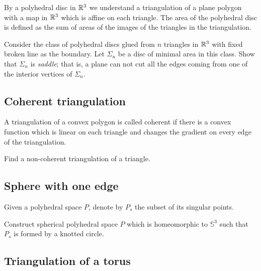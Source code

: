 By a polyhedral disc in $\mathbb{R}^3$
we understand a triangulation of a plane polygon with a map in $\mathbb{R}^3$ which is affine on each triangle.
The area of the polyhedral disc is defined as the sum of areas of the images of the triangles in the triangulation.

\begin{pr}
Consider the  class of polyhedral discs glued from $n$ triangles in $\mathbb{R}^3$ 
with fixed broken line as the boundary.
Let $\Sigma_n$ be a disc of minimal area in this class.
Show that $\Sigma_n$ is  \emph{saddle};
that is, a plane can not cut all the edges coming from one of the interior vertices of $\Sigma_n$.
\end{pr}

\subsection*{Coherent triangulation\easy}\label{Coherent triangulation} 

A triangulation of a convex polygon is called coherent if there is a convex function which is linear on each triangle and changes the gradient on every edge of the triangulation.

\begin{pr}
Find a non-coherent triangulation of a triangle.
\end{pr}

\subsection*{Sphere with one edge\hard}\label{panov-S^3} 

Given  a polyhedral space $P$,
denote by $P_s$ the subset of its 
singular points.

\begin{pr}
Construct spherical polyhedral space $P$ which is homeomorphic to $\mathbb{S}^3$ such that $P_s$ is formed by a knotted circle.
\end{pr}

\subsection*{Triangulation of a torus}\label{Triangulation of a torus}


